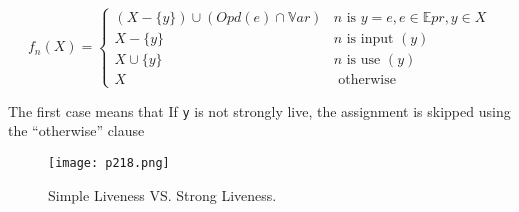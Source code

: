 $$
f_n(X)= \begin{cases}(X-\{y\}) \cup(Opd(e) \cap \mathbb{V}ar) & n \text { is } y=e, e \in \mathbb{E}pr, y \in X \\ X-\{y\} & n \text { is input }(y) \\ X \cup\{y\} & n \text { is use }(y) \\ X & \text { otherwise }\end{cases}
$$


The first case means that If \texttt{y} is not strongly live, the
assignment is skipped using
the “otherwise” clause

\begin{figure}[H]
    \centering
    \texttt{[image: p218.png]}
    \caption{Simple Liveness VS. Strong Liveness.}
    \label{fig:p218}
\end{figure}
